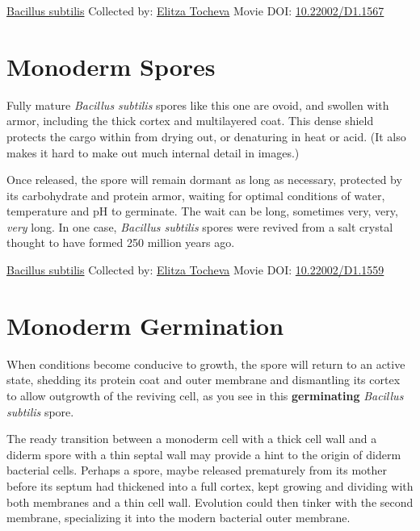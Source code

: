 \documentclass[]{tufte-book}
\begin{document}
\hypertarget{htmlwidget-e08ab61ce1c9e60dd5ff}{}

\label{fig:8-6b}\protect\hyperlink{tree}{Bacillus subtilis} Collected by: \protect\hyperlink{elitza_tocheva}{Elitza Tocheva} Movie DOI: \href{https://doi.org/10.22002/D1.1567}{10.22002/D1.1567}

\hypertarget{monoderm-spores}{%
\section{Monoderm Spores}\label{monoderm-spores}}

Fully mature \emph{Bacillus subtilis} spores like this one are ovoid, and swollen with armor, including the thick cortex and multilayered coat. This dense shield protects the cargo within from drying out, or denaturing in heat or acid. (It also makes it hard to make out much internal detail in images.)

Once released, the spore will remain dormant as long as necessary, protected by its carbohydrate and protein armor, waiting for optimal conditions of water, temperature and pH to germinate. The wait can be long, sometimes very, very, \emph{very} long. In one case, \emph{Bacillus subtilis} spores were revived from a salt crystal thought to have formed 250 million years ago.



\hypertarget{htmlwidget-040658ad9bb3b563774c}{}

\label{fig:8-7}\protect\hyperlink{tree}{Bacillus subtilis} Collected by: \protect\hyperlink{elitza_tocheva}{Elitza Tocheva} Movie DOI: \href{https://doi.org/10.22002/D1.1559}{10.22002/D1.1559}

\hypertarget{monoderm-germination}{%
\section{Monoderm Germination}\label{monoderm-germination}}

When conditions become conducive to growth, the spore will return to an active state, shedding its protein coat and outer membrane and dismantling its cortex to allow outgrowth of the reviving cell, as you see in this \textbf{germinating} \emph{Bacillus subtilis} spore.

The ready transition between a monoderm cell with a thick cell wall and a diderm spore with a thin septal wall may provide a hint to the origin of diderm bacterial cells. Perhaps a spore, maybe released prematurely from its mother before its septum had thickened into a full cortex, kept growing and dividing with both membranes and a thin cell wall. Evolution could then tinker with the second membrane, specializing it into the modern bacterial outer membrane.
\end{document}
